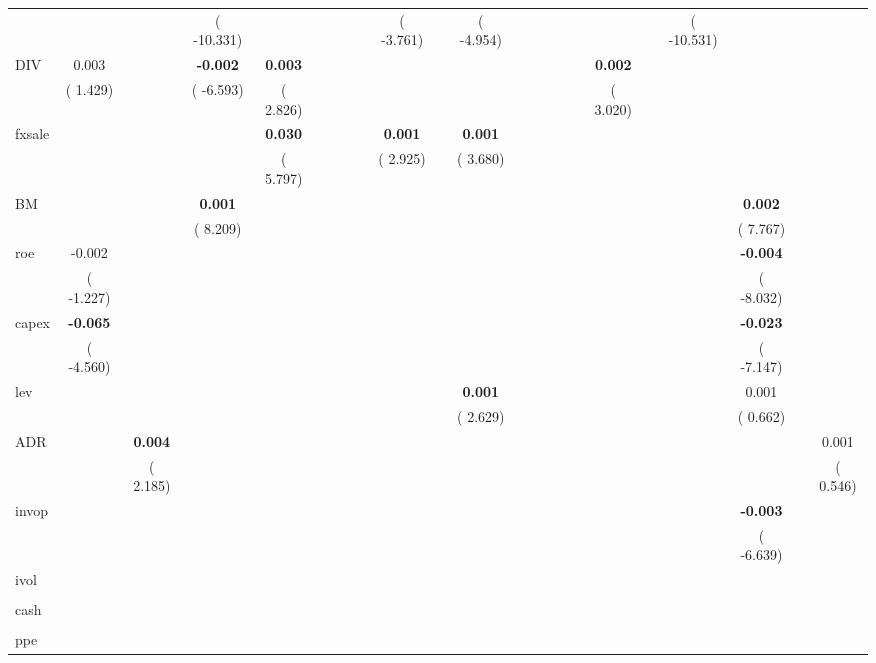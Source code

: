 \begin{sidewaystable}[h!]
{\begin{tabular}{l*{22}{c}}
& & &( -10.331) & & & & & &(  -3.761) & &(  -4.954) & & & & & & & &( -10.531) & & &\\ 
DIV &   0.003  &  &\textbf{  -0.002}  &\textbf{   0.003}  &  &  &  &  &  &  &  &  &  &  &  &  &\textbf{   0.002}  &  &  &  &  &\\ 
&(   1.429) & &(  -6.593) &(   2.826) & & & & & & & & & & & & &(   3.020) & & & & &\\ 
fxsale &  &  &  &\textbf{   0.030}  &  &  &  &  &\textbf{   0.001}  &  &\textbf{   0.001}  &  &  &  &  &  &  &  &  &  &  &\\ 
& & & &(   5.797) & & & & &(   2.925) & &(   3.680) & & & & & & & & & & &\\ 
BM &  &  &\textbf{   0.001}  &  &  &  &  &  &  &  &  &  &  &  &  &  &  &  &  &\textbf{   0.002}  &  &\\ 
& & &(   8.209) & & & & & & & & & & & & & & & & &(   7.767) & &\\ 
roe &  -0.002  &  &  &  &  &  &  &  &  &  &  &  &  &  &  &  &  &  &  &\textbf{  -0.004}  &  &\\ 
&(  -1.227) & & & & & & & & & & & & & & & & & & &(  -8.032) & &\\ 
capex &\textbf{  -0.065}  &  &  &  &  &  &  &  &  &  &  &  &  &  &  &  &  &  &  &\textbf{  -0.023}  &  &\\ 
&(  -4.560) & & & & & & & & & & & & & & & & & & &(  -7.147) & &\\ 
lev &  &  &  &  &  &  &  &  &  &  &\textbf{   0.001}  &  &  &  &  &  &  &  &  &   0.001  &  &\\ 
& & & & & & & & & & &(   2.629) & & & & & & & & &(   0.662) & &\\ 
ADR &  &\textbf{   0.004}  &  &  &  &  &  &  &  &  &  &  &  &  &  &  &  &  &  &  &  &   0.001\\ 
& &(   2.185) & & & & & & & & & & & & & & & & & & & &(   0.546)\\ 
invop &  &  &  &  &  &  &  &  &  &  &  &  &  &  &  &  &  &  &  &\textbf{  -0.003}  &  &\\ 
& & & & & & & & & & & & & & & & & & & &(  -6.639) & &\\ 
ivol &  &  &  &  &  &  &  &  &  &  &  &  &  &  &  &  &  &  &  &  &  &\\ 
& & & & & & & & & & & & & & & & & & & & & &\\ 
cash &  &  &  &  &  &  &  &  &  &  &  &  &  &  &  &  &  &  &  &  &  &\\ 
& & & & & & & & & & & & & & & & & & & & & &\\ 
ppe &  &  &  &  &  &  &  &  &  &  &  &  &  &  &  &  &  &  &  &  &  &\\ 

\end{tabular}}
\end{sidewaystable}
